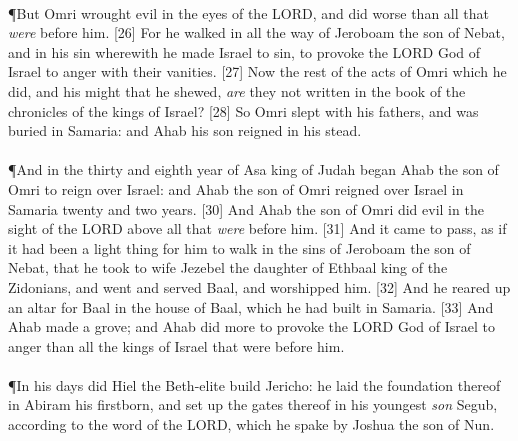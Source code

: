 \\
\P \textcolor[cmyk]{0.99998,1,0,0}{But Omri wrought evil in the eyes of the LORD, and did worse than all that \emph{were} before him.}
[26] \textcolor[cmyk]{0.99998,1,0,0}{For he walked in all the way of Jeroboam the son of Nebat, and in his sin wherewith he made Israel to sin, to provoke the LORD God of Israel to anger with their vanities.}
[27] \textcolor[cmyk]{0.99998,1,0,0}{Now the rest of the acts of Omri which he did, and his might that he shewed, \emph{are} they not written in the book of the chronicles of the kings of Israel?}
[28] \textcolor[cmyk]{0.99998,1,0,0}{So Omri slept with his fathers, and was buried in Samaria: and Ahab his son reigned in his stead.}\\
\\
\P \textcolor[cmyk]{0.99998,1,0,0}{And in the thirty and eighth year of Asa king of Judah began Ahab the son of Omri to reign over Israel: and Ahab the son of Omri reigned over Israel in Samaria twenty and two years.}
[30] \textcolor[cmyk]{0.99998,1,0,0}{And Ahab the son of Omri did evil in the sight of the LORD above all that \emph{were} before him.}
[31] \textcolor[cmyk]{0.99998,1,0,0}{And it came to pass, as if it had been a light thing for him to walk in the sins of Jeroboam the son of Nebat, that he took to wife Jezebel the daughter of Ethbaal king of the Zidonians, and went and served Baal, and worshipped him.}
[32] \textcolor[cmyk]{0.99998,1,0,0}{And he reared up an altar for Baal in the house of Baal, which he had built in Samaria.}
[33] \textcolor[cmyk]{0.99998,1,0,0}{And Ahab made a grove; and Ahab did more to provoke the LORD God of Israel to anger than all the kings of Israel that were before him.}\\
\\
\P \textcolor[cmyk]{0.99998,1,0,0}{In his days did Hiel the Beth-elite build Jericho: he laid the foundation thereof in Abiram his firstborn, and set up the gates thereof in his youngest \emph{son} Segub, according to the word of the LORD, which he spake by Joshua the son of Nun.}
